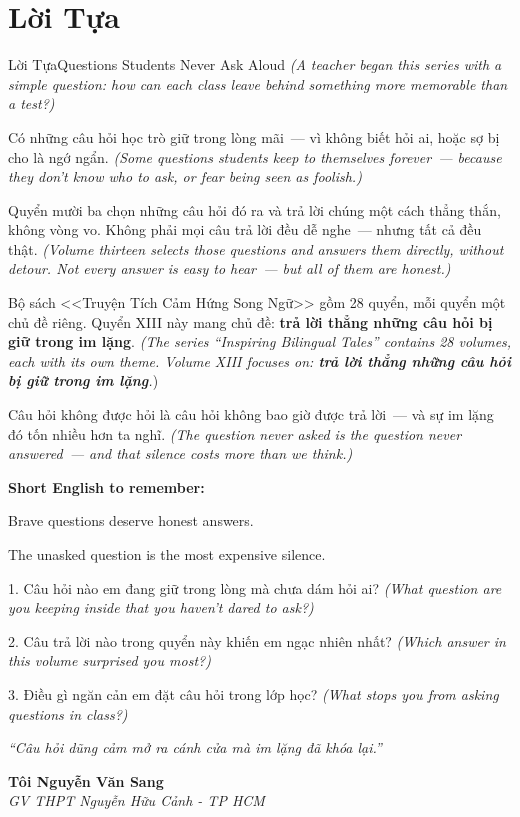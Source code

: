 \chapter*{Lời Tựa}

\begin{truyen}{Lời Tựa}{Questions Students Never Ask Aloud}
\textit{(A teacher began this series with a simple question: how can each class leave behind something more memorable than a test?)}

Có những câu hỏi học trò giữ trong lòng mãi~--- vì không biết hỏi ai, hoặc sợ bị cho là ngớ ngẩn.
\textit{(Some questions students keep to themselves forever~--- because they don't know who to ask, or fear being seen as foolish.)}

Quyển mười ba chọn những câu hỏi đó ra và trả lời chúng một cách thẳng thắn, không vòng vo. Không phải mọi câu trả lời đều dễ nghe~--- nhưng tất cả đều thật.
\textit{(Volume thirteen selects those questions and answers them directly, without detour. Not every answer is easy to hear~--- but all of them are honest.)}

Bộ sách <<Truyện Tích Cảm Hứng Song Ngữ>> gồm 28 quyển, mỗi quyển một chủ đề riêng. Quyển XIII này mang chủ đề: \textbf{trả lời thẳng những câu hỏi bị giữ trong im lặng}.
\textit{(The series ``Inspiring Bilingual Tales'' contains 28 volumes, each with its own theme. Volume XIII focuses on: \textbf{trả lời thẳng những câu hỏi bị giữ trong im lặng}.})
\end{truyen}

\begin{baihoc}
Câu hỏi không được hỏi là câu hỏi không bao giờ được trả lời~--- và sự im lặng đó tốn nhiều hơn ta nghĩ.
\textit{(The question never asked is the question never answered~--- and that silence costs more than we think.)}
\end{baihoc}

\begin{ghinhoanh}
\textbf{Short English to remember:}

Brave questions deserve honest answers.

The unasked question is the most expensive silence.
\end{ghinhoanh}

\begin{tuhocnhanh}
1. Câu hỏi nào em đang giữ trong lòng mà chưa dám hỏi ai? \textit{(What question are you keeping inside that you haven't dared to ask?)}

2. Câu trả lời nào trong quyển này khiến em ngạc nhiên nhất? \textit{(Which answer in this volume surprised you most?)}

3. Điều gì ngăn cản em đặt câu hỏi trong lớp học? \textit{(What stops you from asking questions in class?)}
\end{tuhocnhanh}

\begin{center}
\textit{\color{lamporange}``Câu hỏi dũng cảm mở ra cánh cửa mà im lặng đã khóa lại.''}
\end{center}

\begin{flushright}
\textbf{Tôi Nguyễn Văn Sang}\\
\textit{GV THPT Nguyễn Hữu Cảnh - TP HCM}
\end{flushright}

\ngancach
